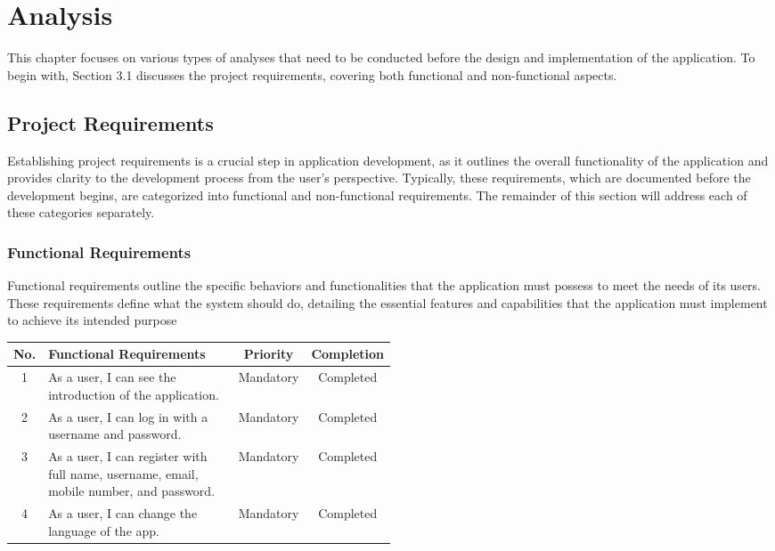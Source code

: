 \chapter{Analysis}
This chapter focuses on various types of analyses that need to be conducted before the design and implementation of the application. To begin with, Section 3.1 discusses the project requirements, covering both functional and non-functional aspects.

\section{Project Requirements}

Establishing project requirements is a crucial step in application development, as it outlines the overall functionality of the application and provides clarity to the development process from the user's perspective. Typically, these requirements, which are documented before the development begins, are categorized into functional and non-functional requirements. The remainder of this section will address each of these categories separately.

\subsection{Functional Requirements}
Functional requirements outline the specific behaviors and functionalities that the application must possess to meet the needs of its users. These requirements define what the system should do, detailing the essential features and capabilities that the application must implement to achieve its intended purpose

\begin{table}[H]
    \centering
    \begin{tabular}{|c|>{\centering\arraybackslash}p{0.5\linewidth}|c|c|}
               \hline
        \textbf{No.} & \textbf{Functional Requirements} & \textbf{Priority} & \textbf{Completion} \\
        \hline
        1 & As a user, I can see the introduction of the application. & Mandatory & Completed \\
        \hline
        2 & As a user, I can log in with a username and password. & Mandatory & Completed \\
        \hline
        3 & As a user, I can register with full name, username, email, mobile number, and password. & Mandatory & Completed \\
        \hline
        4 & As a user, I can change the language of the app. & Mandatory & Completed \\
        \hline
    \end{tabular}
    \label{tab:table1}
\end{table}

